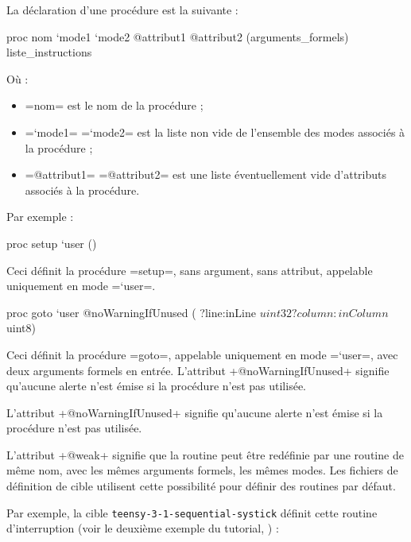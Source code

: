 La déclaration d'une procédure est la suivante :
\begin{PLM}
proc nom `mode1 `mode2 @attribut1 @attribut2 (arguments_formels) {
  liste_instructions
}
\end{PLM}
Où :
\begin{itemize}
  \item \plm=nom= est le nom de la procédure ;
  \item \plm=`mode1= \plm=`mode2= est la liste non vide de l'ensemble des modes associés à la procédure ;
  \item \plm=@attribut1= \plm=@attribut2= est une liste éventuellement vide d'attributs associés à la procédure.
\end{itemize}

Par exemple :

\begin{PLM}
proc setup `user () {
}
\end{PLM}

Ceci définit la procédure \plm=setup=, sans argument, sans attribut, appelable uniquement en mode \plm=`user=.

\begin{PLM}
proc goto `user @noWarningIfUnused (
  ?line:inLine $uint32
  ?column:inColumn $uint8) {
}
\end{PLM}

Ceci définit la procédure \plm=goto=, appelable uniquement en mode \plm=`user=, avec deux arguments formels en entrée. L'attribut \plm+@noWarningIfUnused+ signifie qu'aucune alerte n'est émise si la procédure n'est pas utilisée.








L'attribut \plm+@noWarningIfUnused+ signifie qu'aucune alerte n'est émise si la procédure n'est pas utilisée.




L'attribut \plm+@weak+ signifie que la routine peut être redéfinie par une routine de même nom, avec les mêmes arguments formels, les mêmes modes. Les fichiers de définition de cible utilisent cette possibilité pour définir des routines par défaut.

Par exemple, la cible \texttt{teensy-3-1-sequential-systick} définit cette routine d'interruption (voir le deuxième exemple du tutorial, ) :

